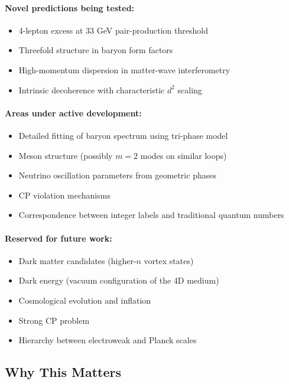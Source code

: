 \paragraph{Novel predictions being tested:}
\begin{itemize}
\item 4-lepton excess at 33 GeV pair-production threshold
\item Threefold structure in baryon form factors
\item High-momentum dispersion in matter-wave interferometry
\item Intrinsic decoherence with characteristic $d^2$ scaling
\end{itemize}

\paragraph{Areas under active development:}
\begin{itemize}
\item Detailed fitting of baryon spectrum using tri-phase model
\item Meson structure (possibly $m=2$ modes on similar loops)
\item Neutrino oscillation parameters from geometric phases
\item CP violation mechanisms
\item Correspondence between integer labels and traditional quantum numbers
\end{itemize}

\paragraph{Reserved for future work:}
\begin{itemize}
\item Dark matter candidates (higher-$n$ vortex states)
\item Dark energy (vacuum configuration of the 4D medium)
\item Cosmological evolution and inflation
\item Strong CP problem
\item Hierarchy between electroweak and Planck scales
\end{itemize}

\subsection{Why This Matters}

